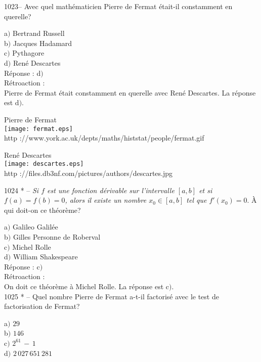 ﻿\documentclass[letterpaper, 12pt]{article}
\begin{document}
1023-- Avec quel math\'ematicien Pierre de Fermat \'etait-il
constamment en querelle?

a$)$ Bertrand Russell \\
b$)$ Jacques Hadamard \\
c$)$ Pythagore \\
d$)$ Ren\'e Descartes\\

R\'eponse : d$)$\\

R\'etroaction : \\
Pierre de Fermat \'etait constamment en querelle avec Ren\'e
Descartes. La r\'eponse est d$)$.

        \begin{center}
        Pierre de Fermat\\
    \texttt{[image: fermat.eps]}\\
        {\footnotesize http
://www.york.ac.uk/depts/maths/histstat/people/fermat.gif}
    \end{center}

        \begin{center}
        Ren\'e Descartes\\
    \texttt{[image: descartes.eps]}\\
        {\footnotesize http
://files.db3nf.com/pictures/authors/descartes.jpg}
    \end{center}


1024 * -- {\sl Si $f$ est une fonction d\'erivable sur l'intervalle
$[a,b]$ et si $f(a)=f(b)=0$, alors il existe un nombre $x_0\in[a,b]$
tel que $f'(x_0)=0$}. \`A qui doit-on ce th\'eor\`eme?

a$)$ Galileo Galil\'ee \\
b$)$ Gilles Personne de Roberval \\
c$)$ Michel Rolle \\
d$)$ William Shakespeare\\

R\'eponse : c$)$\\

R\'etroaction : \\
On doit ce th\'eor\`eme \`a Michel Rolle.
La r\'eponse est c$)$.\\


1025 * -- Quel nombre Pierre de Fermat a-t-il factoris\'e avec le
test de factorisation de Fermat?

a$)$ $29$ \\
b$)$ $146$ \\
c$)$ $2^{61}\,-\,1$ \\
d$)$ $2\,027\,651\,281$\\
\end{document}
